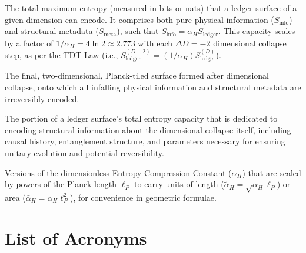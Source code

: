 \documentclass[a4paper, 12pt, oneside]{book}
\numberwithin{equation}{chapter}
\begin{document}
\medskip
{}\par\nopagebreak
\medskip
The total maximum entropy (measured in bits or nats) that a ledger surface of a given dimension can encode. It comprises both pure physical information ($S_{\text{info}}$) and structural metadata ($S_{\text{meta}}$), such that $S_{\text{info}} = \alpha_H S_{\text{ledger}}$. This capacity scales by a factor of $1/\alpha_H = 4\ln 2 \approx 2.773$ with each $\Delta D = -2$ dimensional collapse step, as per the TDT Law (i.e., $S_{\text{ledger}}^{(D-2)} = (1/\alpha_H)S_{\text{ledger}}^{(D)}$).
\bigskip

\medskip
{}\par\nopagebreak
\medskip
The final, two-dimensional, Planck-tiled surface formed after dimensional collapse, onto which all infalling physical information and structural metadata are irreversibly encoded.
\bigskip

\medskip
{}\par\nopagebreak
\medskip
The portion of a ledger surface's total entropy capacity that is dedicated to encoding structural information about the dimensional collapse itself, including causal history, entanglement structure, and parameters necessary for ensuring unitary evolution and potential reversibility.
\bigskip

\medskip
{}\par\nopagebreak
\medskip
Versions of the dimensionless Entropy Compression Constant ($\alpha_H$) that are scaled by powers of the Planck length $\ell_P$ to carry units of length ($\tilde\alpha_H = \sqrt{\alpha_H}\ell_P$) or area ($\bar\alpha_H = \alpha_H\ell_P^2$), for convenience in geometric formulae.
\bigskip


\clearpage

\section*{List of Acronyms}
\end{document}
